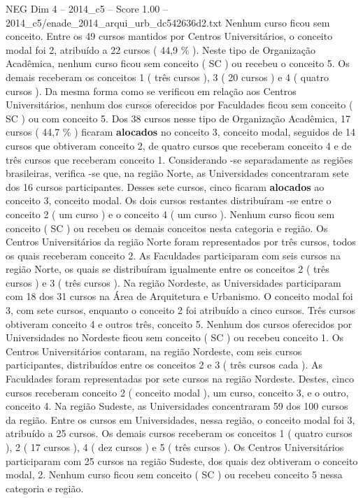 \begin{textsample}{NEG Dim 4 – 2014\_c5 – Score 1.00 – 2014\_c5/enade\_2014\_arqui\_urb\_dc542636d2.txt}
Nenhum curso ficou sem conceito.
Entre os 49 cursos mantidos por Centros Universitários, o conceito modal foi 2, atribuído a 22 cursos ( 44,9 \% ).
Neste tipo de Organização Acadêmica, nenhum curso ficou sem conceito ( SC ) ou recebeu o conceito 5.
Os demais receberam os conceitos 1 ( três cursos ), 3 ( 20 cursos ) e 4 ( quatro cursos ).
Da mesma forma como se verificou em relação aos Centros Universitários, nenhum dos cursos oferecidos por Faculdades ficou sem conceito ( SC ) ou com conceito 5.
Dos 38 cursos nesse tipo de Organização Acadêmica, 17 cursos ( 44,7 \% ) ficaram \textbf{alocados} no conceito 3, conceito modal, seguidos de 14 cursos que obtiveram conceito 2, de quatro cursos que receberam conceito 4 e de três cursos que receberam conceito 1.
Considerando -se separadamente as regiões brasileiras, verifica -se que, na região Norte, as Universidades concentraram sete dos 16 cursos participantes.
Desses sete cursos, cinco ficaram \textbf{alocados} ao conceito 3, conceito modal.
Os dois cursos restantes distribuíram -se entre o conceito 2 ( um curso ) e o conceito 4 ( um curso ).
Nenhum curso ficou sem conceito ( SC ) ou recebeu os demais conceitos nesta categoria e região.
Os Centros Universitários da região Norte foram representados por três cursos, todos os quais receberam conceito 2.
As Faculdades participaram com seis cursos na região Norte, os quais se distribuíram igualmente entre os conceitos 2 ( três cursos ) e 3 ( três cursos ).
Na região Nordeste, as Universidades participaram com 18 dos 31 cursos na Área de Arquitetura e Urbanismo.
O conceito modal foi 3, com sete cursos, enquanto o conceito 2 foi atribuído a cinco cursos.
Três cursos obtiveram conceito 4 e outros três, conceito 5.
Nenhum dos cursos oferecidos por Universidades no Nordeste ficou sem conceito ( SC ) ou recebeu conceito 1.
Os Centros Universitários contaram, na região Nordeste, com seis cursos participantes, distribuídos entre os conceitos 2 e 3 ( três cursos cada ).
As Faculdades foram representadas por sete cursos na região Nordeste.
Destes, cinco cursos receberam conceito 2 ( conceito modal ), um curso, conceito 3, e o outro, conceito 4.
Na região Sudeste, as Universidades concentraram 59 dos 100 cursos da região.
Entre os cursos em Universidades, nessa região, o conceito modal foi 3, atribuído a 25 cursos.
Os demais cursos receberam os conceitos 1 ( quatro cursos ), 2 ( 17 cursos ), 4 ( dez cursos ) e 5 ( três cursos ).
Os Centros Universitários participaram com 25 cursos na região Sudeste, dos quais dez obtiveram o conceito modal, 2.
Nenhum curso ficou sem conceito ( SC ) ou recebeu conceito 5 nessa categoria e região.

\end{textsample}
